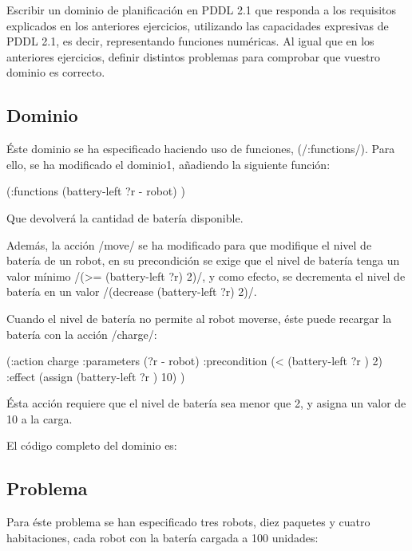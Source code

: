 \documentclass[	DIV=calc,%
							paper=a4,%
							fontsize=11pt]{scrartcl}	 					%
\newcommand{\miit}[1]{{\usefont{T1}{mdugm}{m}{it}\selectfont #1}}
\newcommand{\lispscript}[2]{
    \myLisp[label=#2]{#1}
}
\begin{document}
\miit{Escribir un dominio de planificación en PDDL 2.1 que responda a los requisitos
explicados en los anteriores ejercicios, utilizando las capacidades expresivas de PDDL
2.1, es decir, representando funciones numéricas. Al igual que en los anteriores
ejercicios, definir distintos problemas para comprobar que vuestro dominio es
correcto.}

\subsection{Dominio}
\label{sub:Dominio}

Éste dominio se ha especificado haciendo uso de funciones, (\newlispinline/:functions/). Para ello, se ha modificado el dominio1, añadiendo la siguiente función:

\begin{newlispcode}
	(:functions
		(battery-left ?r - robot)
	)
\end{newlispcode}

Que devolverá la cantidad de batería disponible.

Además, la acción \newlispinline/move/ se ha modificado para que modifique el nivel de batería de un robot, en su precondición se exige que el nivel de batería tenga un valor mínimo \newlispinline/(>= (battery-left ?r) 2)/, y como efecto, se decrementa el nivel de batería en un valor \newlispinline/(decrease (battery-left ?r) 2)/.

Cuando el nivel de batería no permite al robot moverse, éste puede recargar la batería con la acción \newlispinline/charge/:

\begin{newlispcode}
  (:action charge
    :parameters (?r - robot)
    :precondition (< (battery-left ?r ) 2)
    :effect (assign (battery-left ?r ) 10)
  )
\end{newlispcode}

Ésta acción requiere que el nivel de batería sea menor que 2, y asigna un valor de 10 a la carga.

El código completo del dominio es:

\lispscript{../d4.pddl}{d4.pddl}

\subsection{Problema}
\label{sub:Problema}

Para éste problema se han especificado tres robots, diez paquetes y cuatro habitaciones, cada robot con la batería cargada a 100 unidades:
\end{document}

